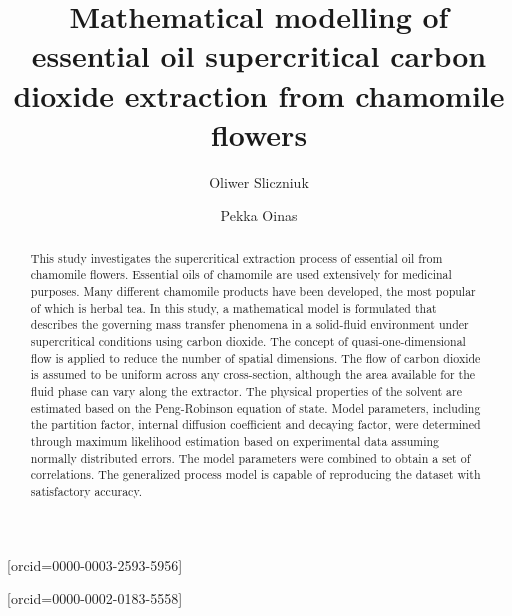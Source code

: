 \documentclass[a4paper,fleqn]{cas-dc}
\begin{document}
 

\title[mode=title]{Mathematical modelling of essential oil supercritical carbon dioxide extraction from chamomile flowers} 


\author[1]{Oliwer Sliczniuk}[orcid=0000-0003-2593-5956]
\cormark[1]

\author[1]{Pekka Oinas}[orcid=0000-0002-0183-5558]

\address[1]{Aalto University, School of Chemical Engineering, Espoo, 02150, Finland}


\begin{abstract}
This study investigates the supercritical extraction process of essential oil from chamomile flowers. Essential oils of chamomile are used extensively for medicinal purposes. Many different chamomile products have been developed, the most popular of which is herbal tea. In this study, a mathematical model is formulated that describes the governing mass transfer phenomena in a solid-fluid environment under supercritical conditions using carbon dioxide. The concept of quasi-one-dimensional flow is applied to reduce the number of spatial dimensions. The flow of carbon dioxide is assumed to be uniform across any cross-section, although the area available for the fluid phase can vary along the extractor. The physical properties of the solvent are estimated based on the Peng-Robinson equation of state. Model parameters, including the partition factor, internal diffusion coefficient and decaying factor, were determined through maximum likelihood estimation based on experimental data assuming normally distributed errors. The model parameters were combined to obtain a set of correlations. The generalized process model is capable of reproducing the dataset with satisfactory accuracy.


\end{abstract}
\end{document}
